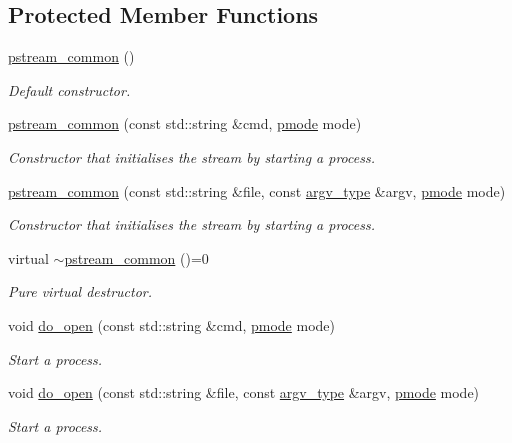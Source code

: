 \subsection*{Protected Member Functions}
\begin{DoxyCompactItemize}
\item 
\mbox{\hyperlink{classredi_1_1pstream__common_a14266d3a2f7089ed99d5537a6a1d9831}{pstream\+\_\+common}} ()
\begin{DoxyCompactList}\small\item\em Default constructor. \end{DoxyCompactList}\item 
\mbox{\hyperlink{classredi_1_1pstream__common_a41a3cff7a8743a81b2d6e1e6051f3d30}{pstream\+\_\+common}} (const std\+::string \&cmd, \mbox{\hyperlink{structredi_1_1pstreams_a1eae4aad88812af03a0fbb3ec13c50b7}{pmode}} mode)
\begin{DoxyCompactList}\small\item\em Constructor that initialises the stream by starting a process. \end{DoxyCompactList}\item 
\mbox{\hyperlink{classredi_1_1pstream__common_a3dc6e49c84bf1b2b3ebbea92a9ee3f6b}{pstream\+\_\+common}} (const std\+::string \&file, const \mbox{\hyperlink{structredi_1_1pstreams_af902b894b095c1875e96c10129489467}{argv\+\_\+type}} \&argv, \mbox{\hyperlink{structredi_1_1pstreams_a1eae4aad88812af03a0fbb3ec13c50b7}{pmode}} mode)
\begin{DoxyCompactList}\small\item\em Constructor that initialises the stream by starting a process. \end{DoxyCompactList}\item 
virtual \mbox{\hyperlink{classredi_1_1pstream__common_a78c3e085c582816ece1fb83fd4f4a652}{$\sim$pstream\+\_\+common}} ()=0
\begin{DoxyCompactList}\small\item\em Pure virtual destructor. \end{DoxyCompactList}\item 
void \mbox{\hyperlink{classredi_1_1pstream__common_a2505ab3e3a834b92d98b5bcb97734dfe}{do\+\_\+open}} (const std\+::string \&cmd, \mbox{\hyperlink{structredi_1_1pstreams_a1eae4aad88812af03a0fbb3ec13c50b7}{pmode}} mode)
\begin{DoxyCompactList}\small\item\em Start a process. \end{DoxyCompactList}\item 
void \mbox{\hyperlink{classredi_1_1pstream__common_a352b77fa600f7ebe0d8f1582be05ae4d}{do\+\_\+open}} (const std\+::string \&file, const \mbox{\hyperlink{structredi_1_1pstreams_af902b894b095c1875e96c10129489467}{argv\+\_\+type}} \&argv, \mbox{\hyperlink{structredi_1_1pstreams_a1eae4aad88812af03a0fbb3ec13c50b7}{pmode}} mode)
\begin{DoxyCompactList}\small\item\em Start a process. \end{DoxyCompactList}\end{DoxyCompactItemize}
